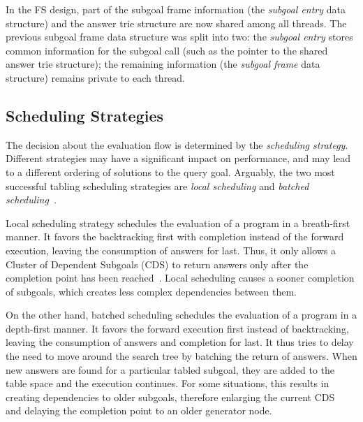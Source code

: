 \documentclass{llncs}
\begin{document}
In the FS design, part of the subgoal frame information (the
\emph{subgoal entry} data structure) and the answer trie structure are
now shared among all threads. The previous subgoal frame data
structure was split into two: the \emph{subgoal entry} stores common
information for the subgoal call (such as the pointer to the shared
answer trie structure); the remaining information (the \emph{subgoal
  frame} data structure) remains private to each thread.

\subsection{Scheduling Strategies}

The decision about the evaluation flow is determined by the
\emph{scheduling strategy}. Different strategies may have a
significant impact on performance, and may lead to a different
ordering of solutions to the query goal. Arguably, the two most
successful tabling scheduling strategies are \emph{local scheduling}
and \emph{batched scheduling}~\cite{Freire-96}.

Local scheduling strategy schedules the evaluation of a program in a
breath-first manner. It favors the backtracking first with completion
instead of the forward execution, leaving the consumption of answers
for last. Thus, it only allows a Cluster of Dependent Subgoals (CDS)
to return answers only after the completion point has been
reached~\cite{Freire-96}. %
Local scheduling causes a sooner completion of subgoals, which creates
less complex dependencies between them.

On the other hand, batched scheduling schedules the evaluation of a
program in a depth-first manner. It favors the forward execution first
instead of backtracking, leaving the consumption of answers and
completion for last. It thus tries to delay the need to move around
the search tree by batching the return of answers. When new answers
are found for a particular tabled subgoal, they are added to the table
space and the execution continues. For some situations, this results
in creating dependencies to older subgoals, therefore enlarging the
current CDS~\cite{Sagonas-98} and delaying the completion point to an
older generator node.
\end{document}

